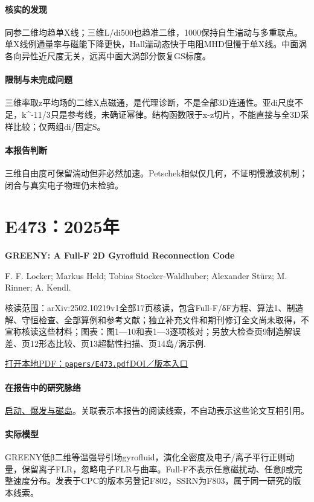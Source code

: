 \paragraph{核实的发现}同参二维均趋单X线；三维L/di500也趋准二维，1000保持自生湍动与多重联点。单X线例通量率与磁能下降更快，Hall湍动态快于电阻MHD但慢于单X线。中面涡各向异性近尺度无关，远离中面大涡部分恢复GS标度。

\paragraph{限制与未完成问题}三维率取z平均场的二维X点磁通，是代理诊断，不是全部3D连通性。亚di尺度不足，k\textasciicircum{}-11/3只是参考线，未确证幂律。结构函数限于x-z切片，不能直接与全3D采样比较；仅两组di/固定S。

\paragraph{本报告判断}三维自由度可保留湍动但非必然加速。Petschek相似仅几何，不证明慢激波机制；闭合与真实电子物理仍未检验。

\section{E473：2025年}\label{paper:E473}

\textbf{GREENY: A Full-F 2D Gyrofluid Reconnection Code}\citep{E473}\

F. F. Locker;  Markus Held;  Tobias Stocker-Waldhuber;  Alexander Stürz;  M. Rinner;  A. Kendl.

\textsf{核读范围：}arXiv:2502.10219v1全部17页核读，包含Full-F/δF方程、算法1、制造解、守恒检查、全部算例和参考文献；独立补充文件和期刊修订全文尚未取得，不宣称核读这些材料；\textsf{图表：}图1—10和表1—3逐项核对；另放大检查页9制造解误差、页12形态比较、页13超黏性扫描、页14岛/涡示例.

\href{run:papers/E473.pdf}{打开本地PDF：\texttt{papers/E473.pdf}}\quad\href{https://doi.org/10.1016/j.cpc.2025.109807}{DOI／版本入口}

\paragraph{在报告中的研究脉络}\hyperref[story:onset]{启动、爆发与磁岛}。关联表示本报告的阅读线索，不自动表示这些论文互相引用。

\paragraph{实际模型}GREENY低β二维等温强导引场gyrofluid，演化全密度及电子/离子平行正则动量，保留离子FLR，忽略电子FLR与曲率。Full-F不表示任意磁扰动、任意β或完整速度分布。发表于CPC的版本另登记F802，SSRN为F803，属于同一研究的版本线索。

